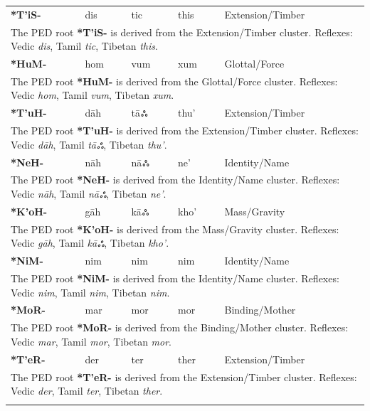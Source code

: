 \begin{longtable}{p{} p{} p{} p{} p{}}
\textbf{*T'iS-} & dis & tic & this & Extension/Timber \\ 
\multicolumn{5}{p{\textwidth}}{\small The PED root \textbf{*T'iS-} is derived from the Extension/Timber cluster. Reflexes: Vedic \textit{dis}, Tamil \textit{tic}, Tibetan \textit{this}. } \\ \addlinespace 
\textbf{*HuM-} & hom & vum & xum & Glottal/Force \\ 
\multicolumn{5}{p{\textwidth}}{\small The PED root \textbf{*HuM-} is derived from the Glottal/Force cluster. Reflexes: Vedic \textit{hom}, Tamil \textit{vum}, Tibetan \textit{xum}. } \\ \addlinespace 
\textbf{*T'uH-} & dāh & tāஃ & thu' & Extension/Timber \\ 
\multicolumn{5}{p{\textwidth}}{\small The PED root \textbf{*T'uH-} is derived from the Extension/Timber cluster. Reflexes: Vedic \textit{dāh}, Tamil \textit{tāஃ}, Tibetan \textit{thu'}. } \\ \addlinespace 
\textbf{*NeH-} & nāh & nāஃ & ne' & Identity/Name \\ 
\multicolumn{5}{p{\textwidth}}{\small The PED root \textbf{*NeH-} is derived from the Identity/Name cluster. Reflexes: Vedic \textit{nāh}, Tamil \textit{nāஃ}, Tibetan \textit{ne'}. } \\ \addlinespace 
\textbf{*K'oH-} & gāh & kāஃ & kho' & Mass/Gravity \\ 
\multicolumn{5}{p{\textwidth}}{\small The PED root \textbf{*K'oH-} is derived from the Mass/Gravity cluster. Reflexes: Vedic \textit{gāh}, Tamil \textit{kāஃ}, Tibetan \textit{kho'}. } \\ \addlinespace 
\textbf{*NiM-} & nim & nim & nim & Identity/Name \\ 
\multicolumn{5}{p{\textwidth}}{\small The PED root \textbf{*NiM-} is derived from the Identity/Name cluster. Reflexes: Vedic \textit{nim}, Tamil \textit{nim}, Tibetan \textit{nim}. } \\ \addlinespace 
\textbf{*MoR-} & mar & mor & mor & Binding/Mother \\ 
\multicolumn{5}{p{\textwidth}}{\small The PED root \textbf{*MoR-} is derived from the Binding/Mother cluster. Reflexes: Vedic \textit{mar}, Tamil \textit{mor}, Tibetan \textit{mor}. } \\ \addlinespace 
\textbf{*T'eR-} & der & ter & ther & Extension/Timber \\ 
\multicolumn{5}{p{\textwidth}}{\small The PED root \textbf{*T'eR-} is derived from the Extension/Timber cluster. Reflexes: Vedic \textit{der}, Tamil \textit{ter}, Tibetan \textit{ther}. } \\ \addlinespace 

\end{longtable}
